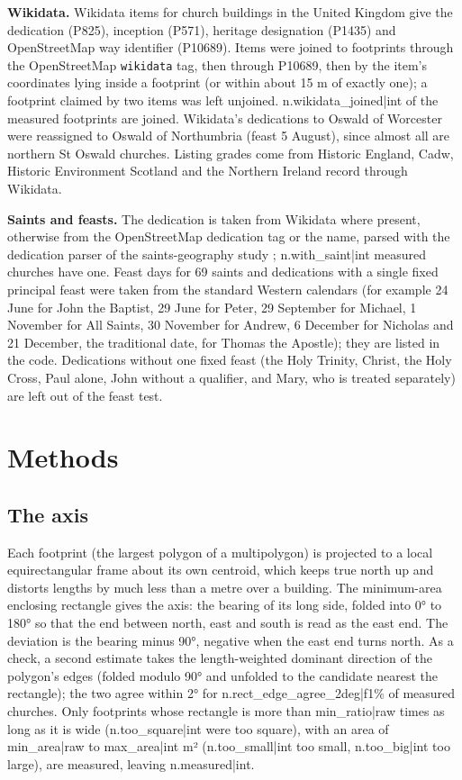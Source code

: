 \documentclass[11pt,a4paper]{article}
\begin{document}
\textbf{Wikidata.} Wikidata \citep{wikidata} items for church buildings in the United Kingdom give the dedication (P825), inception (P571), heritage designation (P1435) and OpenStreetMap way identifier (P10689). Items were joined to footprints through the OpenStreetMap \texttt{wikidata} tag, then through P10689, then by the item's coordinates lying inside a footprint (or within about 15 m of exactly one); a footprint claimed by two items was left unjoined. {{n.wikidata_joined|int}} of the measured footprints are joined. Wikidata's dedications to Oswald of Worcester were reassigned to Oswald of Northumbria (feast 5 August), since almost all are northern St Oswald churches. Listing grades come from Historic England, Cadw, Historic Environment Scotland and the Northern Ireland record through Wikidata.

\textbf{Saints and feasts.} The dedication is taken from Wikidata where present, otherwise from the OpenStreetMap dedication tag or the name, parsed with the dedication parser of the saints-geography study \citep{saintsgeo}; {{n.with_saint|int}} measured churches have one. Feast days for 69 saints and dedications with a single fixed principal feast were taken from the standard Western calendars (for example 24 June for John the Baptist, 29 June for Peter, 29 September for Michael, 1 November for All Saints, 30 November for Andrew, 6 December for Nicholas and 21 December, the traditional date, for Thomas the Apostle); they are listed in the code. Dedications without one fixed feast (the Holy Trinity, Christ, the Holy Cross, Paul alone, John without a qualifier, and Mary, who is treated separately) are left out of the feast test.

\section{Methods}
\subsection{The axis}
Each footprint (the largest polygon of a multipolygon) is projected to a local equirectangular frame about its own centroid, which keeps true north up and distorts lengths by much less than a metre over a building. The minimum-area enclosing rectangle \citep{freeman} gives the axis: the bearing of its long side, folded into 0° to 180° so that the end between north, east and south is read as the east end. The deviation is the bearing minus 90°, negative when the east end turns north. As a check, a second estimate takes the length-weighted dominant direction of the polygon's edges (folded modulo 90° and unfolded to the candidate nearest the rectangle); the two agree within 2° for {{n.rect_edge_agree_2deg|f1}}\% of measured churches. Only footprints whose rectangle is more than {{min_ratio|raw}} times as long as it is wide ({{n.too_square|int}} were too square), with an area of {{min_area|raw}} to {{max_area|int}} m² ({{n.too_small|int}} too small, {{n.too_big|int}} too large), are measured, leaving {{n.measured|int}}.
\end{document}
